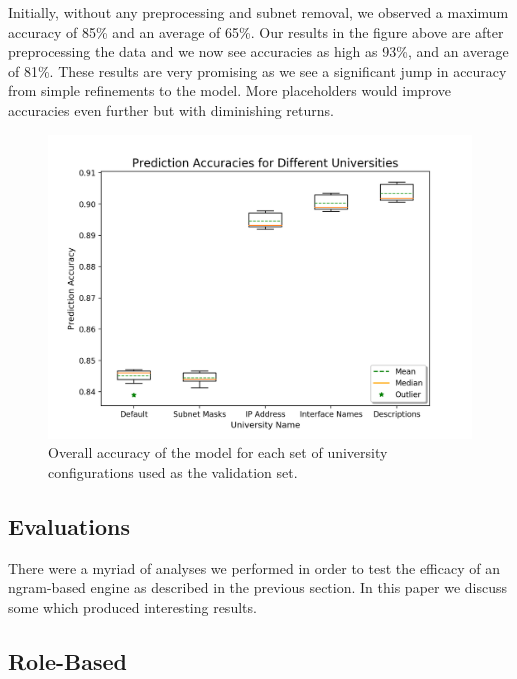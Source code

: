Initially, without any preprocessing and subnet removal, we observed a maximum accuracy of 85\% and an average of 65\%. Our results in the figure above are after preprocessing the data and we now see accuracies as high as 93\%, and an average of 81\%. These results are very promising as we see a significant jump in accuracy from simple refinements to the model. More placeholders would improve accuracies even further but with diminishing returns.

\begin{figure}[H]
	\centering
	\includegraphics[width=\textwidth]{placeholders.png}
	\caption{Overall accuracy of the model for each set of university configurations used as the validation set.}
\end{figure}


\subsection{Evaluations}

There were a myriad of analyses we performed in order to test the efficacy of an ngram-based engine as described in the previous section. In this paper we discuss some which produced interesting results.

\subsection{Role-Based}


